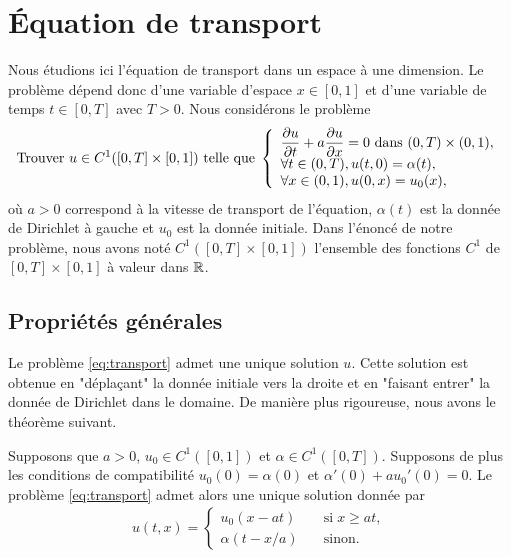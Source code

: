 \documentclass[12pt,a4paper,twoside]{article}
\begin{document}
\section{\'Equation de transport}

Nous \'etudions ici l'\'equation de transport dans un espace \`a une dimension.
Le probl\`eme d\'epend donc d'une variable d'espace $x \in [0,1]$ et d'une variable de temps
$t \in [0,T]$ avec $T>0$.
Nous consid\'erons le probl\`eme
\begin{equation}
  \label{eq:transport}
  \text{Trouver $u \in C^1([0,T] \times [0,1] )$ telle que} \;
  \left\{
    \begin{array}{l}
     \dfrac{\partial u}{\partial t} + a \dfrac{\partial u}{\partial x} = 0 
      \text{ dans } (0,T) \times (0,1),
      \\
      \forall t \in (0,T), u(t,0) = \alpha(t) ,
      \\
      \forall x \in (0,1), u(0,x) = u_0(x) ,
    \end{array}
  \right.
\end{equation}
o\`u $a > 0$ correspond \`a la vitesse de transport de l'\'equation,
$\alpha(t)$ est la donn\'ee de Dirichlet \`a gauche
et $u_0$ est la donn\'ee initiale.
Dans l'\'enonc\'e de notre probl\`eme, nous avons not\'e
$C^1([0,T] \times [0,1])$ l'ensemble des fonctions $C^1$
de $[0,T] \times [0,1]$ \`a valeur dans $\mathbb{R}$.
\subsection{Propri\'et\'es g\'en\'erales}

Le probl\`eme \eqref{eq:transport} admet une unique solution $u$.
Cette solution est obtenue en "d\'epla\c{c}ant" la donn\'ee initiale
vers la droite et en "faisant entrer" la donn\'ee de Dirichlet dans le domaine.
De mani\`ere plus rigoureuse, nous avons le th\'eor\`eme suivant.

\begin{theorem}
  \label{thm:transport_existence}
  Supposons que $a > 0$, $u_0 \in C^1([0,1])$ et $\alpha \in C^1([0,T])$.
  Supposons de plus les conditions de compatibilit\'e $u_0(0) = \alpha(0)$
  et $\alpha'(0) +a u_0'(0)=0$.
  Le probl\`eme \eqref{eq:transport} admet alors une unique solution donn\'ee par
  \begin{align}
    \label{eq:transport_sol}
    u(t,x) = 
    \begin{cases} 
      u_0(x-at) \quad &\text{si} \; x \geq at ,
      \\ 
      \alpha(t-x/a) \quad  &\text{sinon} .
    \end{cases}
  \end{align}
\end{theorem}
\end{document}
